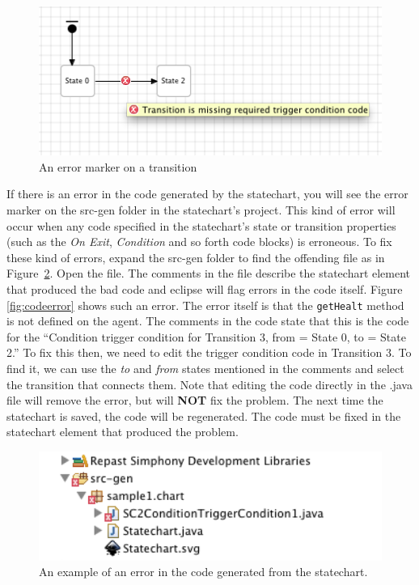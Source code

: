 \documentclass[11pt]{amsart}
\begin{document}
\begin{figure}
\begin{center}
\vspace{.2in}
\centerline {
\includegraphics[width=5in]{StatechartsImages/transition_error.png}
}
\caption{An error marker on a transition}
\label{fig:transitionerror}
\end{center}
\end{figure}


If there is an error in the code generated by the statechart, you will see the error marker on the src-gen folder in the statechart's project. This kind of error will occur when any code specified in the statechart's state or transition properties (such as the \emph{On Exit}, \emph{Condition} and so forth code blocks) is erroneous. To fix these kind of errors, expand the src-gen folder to find the offending file as in Figure~\ref{fig:srcgen}. Open the file. The comments in the file describe the statechart element that produced the bad code and eclipse will flag errors in the code itself. Figure \ref{fig:codeerror} shows such an error. The error itself is that the \texttt{getHealt} method is not defined on the agent. The comments in the code state that this is the code for the ``Condition trigger condition for Transition 3, from = State 0, to = State 2.'' To fix this then, we need to edit the trigger condition code in Transition 3.  To find it, we  can use the \emph{to} and \emph{from} states mentioned in the comments and select the transition that connects them.  Note that editing the code directly in the .java file will remove the error, but will \textbf{NOT} fix the problem. The next time the statechart is saved, the code will be regenerated. The code must be fixed in the statechart element that produced the problem.


\begin{figure}
\begin{center}
\vspace{.2in}
\centerline {
\includegraphics[width=5in]{StatechartsImages/srcgen_error.png}
}
\caption{An example of an error in the code generated from the statechart.}
\label{fig:srcgen}
\end{center}
\end{figure}
\end{document}
